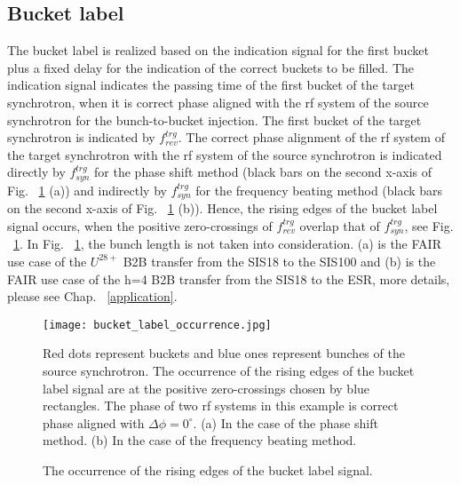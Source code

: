 \subsection{Bucket label}
\label{sec:bucket_label}
The bucket label is realized based on the indication signal for the first bucket plus a fixed delay for the indication of the correct buckets to be filled. The indication signal indicates the passing time of the first bucket of the target synchrotron, when it is correct phase aligned with the rf system of the source synchrotron for the bunch-to-bucket injection. The first bucket of the target synchrotron is indicated by $f_{\mathit{rev}}^{trg}$. The correct phase alignment of the rf system of the target synchrotron with the rf system of the source synchrotron is indicated directly by $f_{\mathit{syn}}^{trg}$ for the phase shift method (black bars on the second x-axis of Fig. ~\ref{bucket_label_occurrence} (a)) and indirectly by $f_{\mathit{syn}}^{trg}$ for the frequency beating method (black bars on the second x-axis of Fig. ~\ref{bucket_label_occurrence} (b)). Hence, the rising edges of the bucket label signal occurs, when the positive zero-crossings of $f_{\mathit{rev}}^{trg}$ overlap that of $f_{\mathit{syn}}^{trg}$, see Fig. ~\ref{bucket_label_occurrence}. In Fig. ~\ref{bucket_label_occurrence}, the bunch length is not taken into consideration. (a) is the FAIR use case of the $U^{28+}$ B2B transfer from the SIS18 to the SIS100 and (b) is the FAIR use case of the h=4 B2B transfer from the SIS18 to the ESR, more details, please see Chap. ~\ref{application}.
\begin{figure}[!htb]
   \centering   
   \texttt{[image: bucket\_label\_occurrence.jpg]}
   \caption{The occurrence of the rising edges of the bucket label signal.}{Red dots represent buckets and blue ones represent bunches of the source synchrotron. The occurrence of the rising edges of the bucket label signal are at the positive zero-crossings chosen by blue rectangles. The phase of two rf systems in this example is correct phase aligned with $\Delta\phi=0^\circ$. (a) In the case of the phase shift method. (b) In the case of the frequency beating method.}
   \label{bucket_label_occurrence}
\end{figure}

